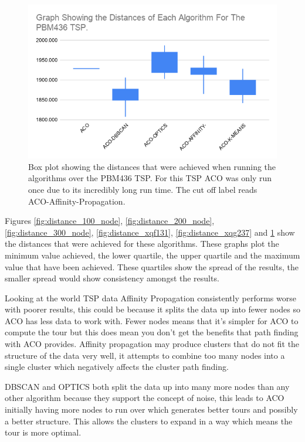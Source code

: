 \begin{figure}
    \centering
    \includegraphics[width=\textwidth]{figures/distance_pbm436_graph.png}
    \caption{Box plot showing the distances that were achieved when running the algorithms over the PBM436 TSP. For this TSP ACO was only run once due to its incredibly long run time. The cut off label reads ACO-Affinity-Propagation.}
    \label{fig:distance_pbm436}
\end{figure}

Figures \ref{fig:distance_100_node}, \ref{fig:distance_200_node}, \ref{fig:distance_300_node}, \ref{fig:distance_xqf131}, \ref{fig:distance_xqg237} and \ref{fig:distance_pbm436} show the distances that were achieved for these algorithms. These graphs plot the minimum value achieved, the lower quartile, the upper quartile and the maximum value that have been achieved. These quartiles show the spread of the results, the smaller spread would show consistency amongst the results. 

Looking at the world TSP data Affinity Propagation consistently performs worse with poorer results, this could be because it splits the data up into fewer nodes so ACO has less data to work with. Fewer nodes means that it's simpler for ACO to compute the tour but this does mean you don't get the benefits that path finding with ACO provides. Affinity propagation may produce clusters that do not fit the structure of the data very well, it attempts to combine too many nodes into a single cluster which negatively affects the cluster  path finding.

DBSCAN and OPTICS both split the data up into many more nodes than any other algorithm because they support the concept of noise, this leads to ACO initially having more nodes to run over which generates better tours and possibly a better structure. This allows the clusters to expand in a way which means the tour is more optimal.


